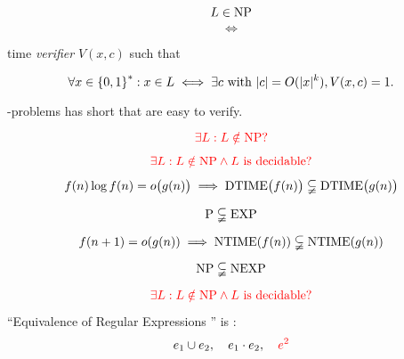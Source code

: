 
\begin{frame}
  \begin{definition}[\np]
	\[
	  L \in \text{NP}
	\]
	\[
	  \iff
	\]
	\begin{center}
	  \red{$\exists$}  time \emph{verifier} $V(x,c)$ such that
	\end{center}
	\[
	  \forall x \in \left\{ 0,1 \right\}^{\ast}: x \in L \iff \exists c \text{ with } |c| = O(|x|^{k}), V(x,c) = 1.
	\]
  \end{definition}

  \vspace{0.50cm}
  \begin{center}
	{\large \np-problems has short  that are easy to verify.}
  \end{center}
\end{frame}

\begin{frame}
  \[
	\textcolor{red}{\exists L: L \notin \text{NP}?}
  \]

  \pause
\end{frame}

\begin{frame}
  \[
	\textcolor{red}{\exists L: L \notin \text{NP} \land L \text{ is decidable}?}
  \]

  \pause
  \begin{theorem}
	\[
	  f(n) \log f(n) = o\big(g(n)\big) \implies \text{DTIME}\big(f(n)\big) \subsetneqq \text{DTIME}\big(g(n)\big)
	\]
  \end{theorem}

  \pause
  \[
	\text{P} \subsetneqq \text{EXP}
  \]

  \pause
  \begin{theorem}
	\[
	  f(n + 1) = o(g(n)) \implies \text{NTIME}(f(n)) \subsetneqq \text{NTIME}(g(n))
	\]
  \end{theorem}

  \pause
  \[
	\text{NP} \subsetneqq \text{NEXP}
  \]
\end{frame}

\begin{frame}
  \[
	\textcolor{red}{\exists L: L \notin \text{NP} \land L \text{ is decidable}?}
  \]

  \pause
  \vspace{0.50cm}
  \begin{exampleblock}{``Equivalence of Regular Expressions '' is \nexpc:}
	\[
	  e_1 \cup e_2,\quad e_1 \cdot e_2,\quad \textcolor{red}{e^{2}}
	\]
  \end{exampleblock}
\end{frame}
